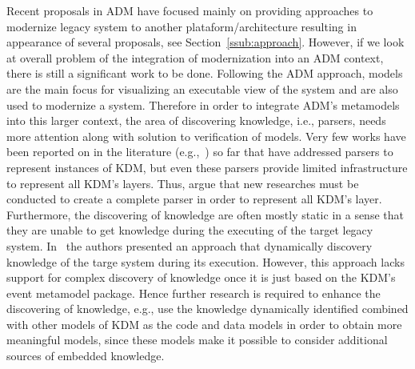 Recent proposals in ADM have focused mainly on providing approaches to modernize legacy system to another plataform/architecture resulting in appearance of several proposals, see Section~\ref{ssub:approach}. However, if we look at overall problem of the integration of modernization into an ADM context, there is still a significant work to be done. Following the ADM approach, models are the main focus for visualizing an executable view of the system and are also used to modernize a system. Therefore in order to integrate ADM's metamodels into this larger context, the area of discovering knowledge, i.e., parsers, needs more attention along with solution to verification of models. Very few works have been reported on in the literature (e.g.,~\cite{5440163,Bruneliere:2010:MGE:1858996.1859032}) so far that have addressed parsers to represent instances of KDM, but even these parsers provide limited infrastructure to represent all KDM's layers. Thus, argue that new researches must be conducted to create a complete parser in order to represent all KDM's layer. Furthermore, the discovering of knowledge are often mostly static in a sense that they are unable to get knowledge during the executing of the target legacy system. In~\cite{5871783} the authors presented an approach that dynamically discovery knowledge of the targe system during its execution. However, this approach lacks support for complex discovery of knowledge once it is just based on the KDM's event metamodel package. Hence further research is required to enhance the discovering of knowledge, e.g., use the knowledge dynamically identified combined with other models of KDM as the code and data models in order to obtain more meaningful models, since these models make it possible to consider additional sources of embedded knowledge.
 

